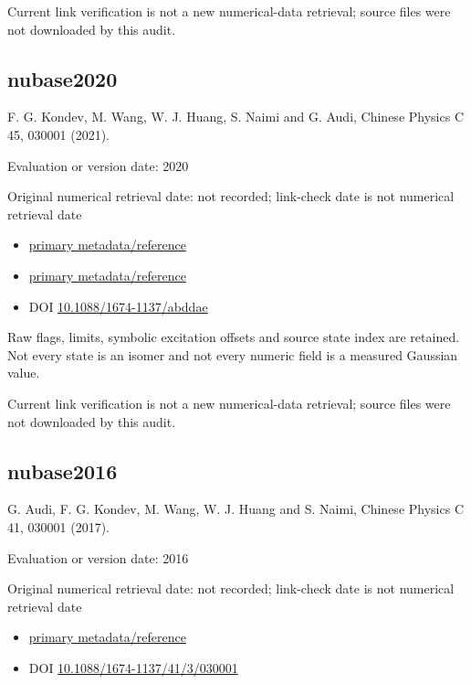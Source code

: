 \documentclass[
  11pt,
  letterpaper,
]{article}
\providecommand{\tightlist}{%
  \setlength{\itemsep}{0pt}\setlength{\parskip}{0pt}}
\begin{document}
Current link verification is not a new numerical-data retrieval; source
files were not downloaded by this audit.

\subsection{nubase2020}\label{nubase2020}

F. G. Kondev, M. Wang, W. J. Huang, S. Naimi and G. Audi, Chinese
Physics C 45, 030001 (2021).

Evaluation or version date: 2020

Original numerical retrieval date: not recorded; link-check date is not
numerical retrieval date

\begin{itemize}
\tightlist
\item
  \href{https://cpc.ihep.ac.cn/article/doi/10.1088/1674-1137/abddae}{primary
  metadata/reference}
\item
  \href{https://www-nds.iaea.org/amdc/}{primary metadata/reference}
\item
  DOI
  \href{https://doi.org/10.1088/1674-1137/abddae}{10.1088/1674-1137/abddae}
\end{itemize}

Raw flags, limits, symbolic excitation offsets and source state index
are retained. Not every state is an isomer and not every numeric field
is a measured Gaussian value.

Current link verification is not a new numerical-data retrieval; source
files were not downloaded by this audit.

\subsection{nubase2016}\label{nubase2016}

G. Audi, F. G. Kondev, M. Wang, W. J. Huang and S. Naimi, Chinese
Physics C 41, 030001 (2017).

Evaluation or version date: 2016

Original numerical retrieval date: not recorded; link-check date is not
numerical retrieval date

\begin{itemize}
\tightlist
\item
  \href{https://cpc.ihep.ac.cn/article/doi/10.1088/1674-1137/41/3/030001}{primary
  metadata/reference}
\item
  DOI
  \href{https://doi.org/10.1088/1674-1137/41/3/030001}{10.1088/1674-1137/41/3/030001}
\end{itemize}
\end{document}
